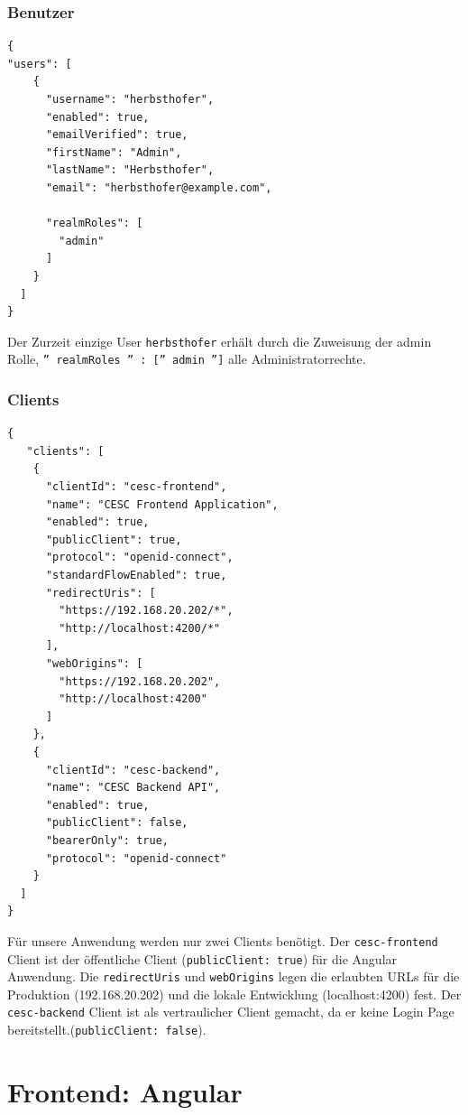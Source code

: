 \subsubsection{Benutzer}
\begin{lstlisting}[caption=Keycloak Benutzer Konfiguration,label=lst:keycloakrealmuser,basicstyle=\ttfamily\small]
{
"users": [
    {
      "username": "herbsthofer",
      "enabled": true,
      "emailVerified": true,
      "firstName": "Admin",
      "lastName": "Herbsthofer",
      "email": "herbsthofer@example.com",

      "realmRoles": [
        "admin"
      ]
    }
  ]
}
\end{lstlisting}
Der Zurzeit einzige User \texttt{herbsthofer} erhält durch die Zuweisung der admin Rolle, \texttt{'' realmRoles '' : ['' admin '']} alle Administratorrechte.
\subsubsection{Clients}
\begin{lstlisting}[caption=Keycloak Realm Client Konfiguration,label=lst:keycloakrealmclient,basicstyle=\ttfamily\small]
{
   "clients": [
    {
      "clientId": "cesc-frontend",
      "name": "CESC Frontend Application",
      "enabled": true,
      "publicClient": true,
      "protocol": "openid-connect",
      "standardFlowEnabled": true,
      "redirectUris": [
        "https://192.168.20.202/*",
        "http://localhost:4200/*"
      ],
      "webOrigins": [
        "https://192.168.20.202",
        "http://localhost:4200"
      ]
    },
    {
      "clientId": "cesc-backend",
      "name": "CESC Backend API",
      "enabled": true,
      "publicClient": false,
      "bearerOnly": true,
      "protocol": "openid-connect"
    }
  ]
}
\end{lstlisting}
Für unsere Anwendung werden nur zwei Clients benötigt. Der \texttt{cesc-frontend} Client ist der öffentliche Client (\texttt{publicClient: true}) für die Angular Anwendung. Die \texttt{redirectUris} und \texttt{webOrigins} legen die erlaubten URLs für die Produktion (192.168.20.202) und die lokale Entwicklung (localhost:4200) fest. Der \texttt{cesc-backend} Client ist als vertraulicher Client gemacht, da er keine Login Page bereitstellt.(\texttt{publicClient: false}).

\section{Frontend: Angular}

